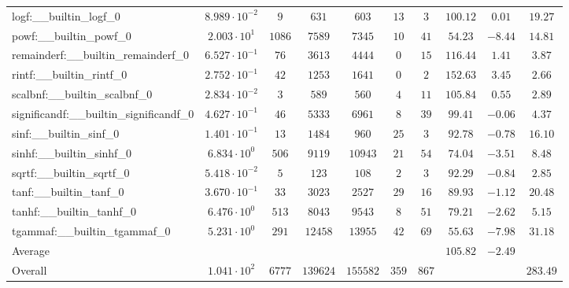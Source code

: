 \begin{tabular}{|l|c|c|c|c|c|c|c|c|c|}
logf:\_\_builtin\_logf\_0                 & $ 8.989 \cdot 10^{-2} $ & $ 9      $ & $ 631    $ & $ 603    $ & $ 13  $ & $ 3   $ & $ 100.12      $ & $ 0.01    $ & $ 19.27   $ \\
powf:\_\_builtin\_powf\_0                 & $ 2.003 \cdot 10^{1}  $ & $ 1086   $ & $ 7589   $ & $ 7345   $ & $ 10  $ & $ 41  $ & $ 54.23       $ & $ -8.44   $ & $ 14.81   $ \\
remainderf:\_\_builtin\_remainderf\_0     & $ 6.527 \cdot 10^{-1} $ & $ 76     $ & $ 3613   $ & $ 4444   $ & $ 0   $ & $ 15  $ & $ 116.44      $ & $ 1.41    $ & $ 3.87    $ \\
rintf:\_\_builtin\_rintf\_0               & $ 2.752 \cdot 10^{-1} $ & $ 42     $ & $ 1253   $ & $ 1641   $ & $ 0   $ & $ 2   $ & $ 152.63      $ & $ 3.45    $ & $ 2.66    $ \\
scalbnf:\_\_builtin\_scalbnf\_0           & $ 2.834 \cdot 10^{-2} $ & $ 3      $ & $ 589    $ & $ 560    $ & $ 4   $ & $ 11  $ & $ 105.84      $ & $ 0.55    $ & $ 2.89    $ \\
significandf:\_\_builtin\_significandf\_0 & $ 4.627 \cdot 10^{-1} $ & $ 46     $ & $ 5333   $ & $ 6961   $ & $ 8   $ & $ 39  $ & $ 99.41       $ & $ -0.06   $ & $ 4.37    $ \\
sinf:\_\_builtin\_sinf\_0                 & $ 1.401 \cdot 10^{-1} $ & $ 13     $ & $ 1484   $ & $ 960    $ & $ 25  $ & $ 3   $ & $ 92.78       $ & $ -0.78   $ & $ 16.10   $ \\
sinhf:\_\_builtin\_sinhf\_0               & $ 6.834 \cdot 10^{0}  $ & $ 506    $ & $ 9119   $ & $ 10943  $ & $ 21  $ & $ 54  $ & $ 74.04       $ & $ -3.51   $ & $ 8.48    $ \\
sqrtf:\_\_builtin\_sqrtf\_0               & $ 5.418 \cdot 10^{-2} $ & $ 5      $ & $ 123    $ & $ 108    $ & $ 2   $ & $ 3   $ & $ 92.29       $ & $ -0.84   $ & $ 2.85    $ \\
tanf:\_\_builtin\_tanf\_0                 & $ 3.670 \cdot 10^{-1} $ & $ 33     $ & $ 3023   $ & $ 2527   $ & $ 29  $ & $ 16  $ & $ 89.93       $ & $ -1.12   $ & $ 20.48   $ \\
tanhf:\_\_builtin\_tanhf\_0               & $ 6.476 \cdot 10^{0}  $ & $ 513    $ & $ 8043   $ & $ 9543   $ & $ 8   $ & $ 51  $ & $ 79.21       $ & $ -2.62   $ & $ 5.15    $ \\
tgammaf:\_\_builtin\_tgammaf\_0           & $ 5.231 \cdot 10^{0}  $ & $ 291    $ & $ 12458  $ & $ 13955  $ & $ 42  $ & $ 69  $ & $ 55.63       $ & $ -7.98   $ & $ 31.18   $ \\
\hline
Average                                   & $                     $ & $        $ & $        $ & $        $ & $     $ & $     $ & $ 105.82      $ & $ -2.49   $ & $         $ \\
\hline
Overall                                   & $ 1.041 \cdot 10^{2}  $ & $ 6777   $ & $ 139624 $ & $ 155582 $ & $ 359 $ & $ 867 $ & $             $ & $         $ & $ 283.49  $ \\
\hline
\end{tabular}
